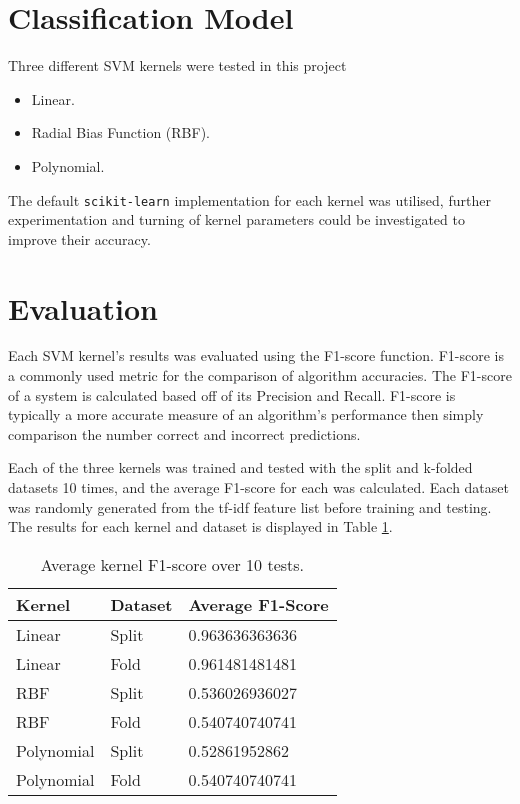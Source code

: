 \documentclass[twocolumn]{article}
\begin{document}
\section{Classification Model}
Three different SVM kernels were tested in this project

\begin{itemize}
    \item Linear.
    \item Radial Bias Function (RBF).
    \item Polynomial.
\end{itemize}
The default {\tt scikit-learn} implementation for each kernel was utilised,
further experimentation and turning of kernel parameters could be investigated
to improve their accuracy.


\section{Evaluation}
Each SVM kernel's results was evaluated using the F1-score function.
F1-score is a commonly used metric for the comparison of algorithm accuracies.
The F1-score of a system is calculated based off of its Precision and
Recall.
F1-score is typically a more accurate measure of an algorithm's performance
then simply comparison the number correct and incorrect predictions.

Each of the three kernels was trained and tested with the split and k-folded
datasets 10 times, and the average F1-score for each was calculated. 
Each dataset was randomly generated from the tf-idf feature list before
training and testing.
The results for each kernel and dataset is displayed in Table \ref{table_res}.

\begin{table}[]
    \centering
        \begin{tabular}{|l|l|l|}
        \hline
        \textbf{Kernel} & \textbf{Dataset} & \textbf{Average F1-Score} \\ \hline
        Linear          & Split            & 0.963636363636            \\ \hline
        Linear          & Fold             & 0.961481481481            \\ \hline
        RBF             & Split            & 0.536026936027            \\ \hline
        RBF             & Fold             & 0.540740740741            \\ \hline
        Polynomial      & Split            & 0.52861952862             \\ \hline
        Polynomial      & Fold             & 0.540740740741            \\ \hline
        \end{tabular}
    \caption{Average kernel F1-score over 10 tests.}
    \label{table_res}
\end{table}
\end{document}
